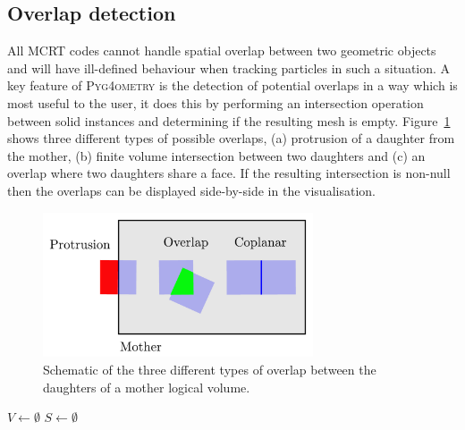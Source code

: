 \documentclass[preprint,12pt]{elsarticle}
\newcommand{\PYGEOMETRY}{\textsc{Pyg4ometry}}
\begin{document}
\subsection{Overlap detection}
All MCRT codes cannot handle spatial overlap between two geometric objects and will have ill-defined behaviour when tracking particles
in such a situation.  A key feature of \PYGEOMETRY{} is the detection of potential overlaps in a way which is most useful to the user, it does this by
performing an intersection operation between solid instances and determining if the resulting mesh is empty. Figure~\ref{fig:overlap} shows three different types of possible
overlaps, (a) protrusion of a daughter from the mother, (b)  finite volume intersection between two daughters  and (c) an overlap where two daughters
share a face. If the resulting intersection is non-null then the overlaps can be displayed side-by-side in the visualisation.
\begin{figure}[htbp]
\begin{center}
\includegraphics[width=8cm]{overlap}
\caption{Schematic of the three different types of overlap between the daughters of a mother logical volume.}
\label{fig:overlap}
\end{center}
\end{figure}


\begin{algorithm}[h]

  $V \longleftarrow \emptyset$
  $S \longleftarrow \emptyset$\;

  \label{algo:overlap}
  \caption{The overlap checking algorithm employed in \PYGEOMETRY{}.  The
    algorithm proceeds by performing the CSG intersection of pairs of
    daughter volume meshes for a given logical volume.  Non-null intersections
    between daughter volume meshes are treated as overlaps.}
\end{algorithm}
\end{document}
